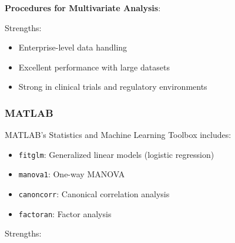 \documentclass[
]{article}
\begin{document}
\textbf{Procedures for Multivariate Analysis}:

\begin{Shaded}
\begin{Highlighting}[]



\end{Highlighting}
\end{Shaded}

Strengths:

\begin{itemize}
\item
  Enterprise-level data handling
\item
  Excellent performance with large datasets
\item
  Strong in clinical trials and regulatory environments
\end{itemize}

\subsubsection{MATLAB}

MATLAB's Statistics and Machine Learning Toolbox includes:

\begin{itemize}
\item
  \texttt{fitglm}: Generalized linear models (logistic regression)
\item
  \texttt{manova1}: One-way MANOVA
\item
  \texttt{canoncorr}: Canonical correlation analysis
\item
  \texttt{factoran}: Factor analysis
\end{itemize}

Strengths:
\end{document}
